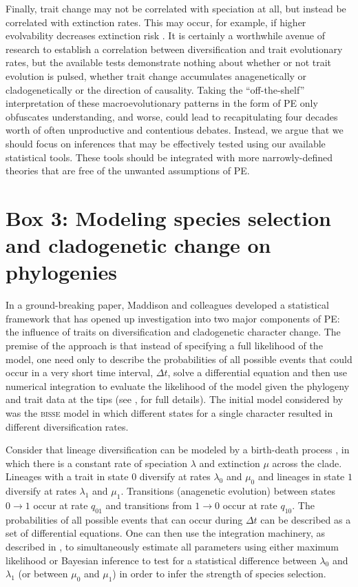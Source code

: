Finally, trait change may not be correlated with speciation at all, but instead be correlated with extinction rates.  This may occur, for example, if higher evolvability decreases extinction risk \citep{Lanfear2010}. It is certainly a worthwhile avenue of research to establish a correlation between diversification and trait evolutionary rates, but the available tests demonstrate nothing about whether or not trait evolution is pulsed, whether trait change accumulates anagenetically or cladogenetically or the direction of causality. Taking the ``off-the-shelf'' interpretation of these macroevolutionary patterns in the form of PE only obfuscates understanding, and worse, could lead to recapitulating four decades worth of often unproductive and contentious debates. Instead, we argue that we should focus on inferences that may be effectively tested using our available statistical tools. These tools should be integrated with more narrowly-defined theories that are free of the unwanted assumptions of PE.  

\section{Box 3: Modeling species selection and cladogenetic change on phylogenies}

In a ground-breaking paper, Maddison and colleagues \citeyearpar{Maddison2007} developed a statistical framework that has opened up investigation into two major components of PE: the influence of traits on diversification \citep[``species selection'', \textit{sensu}][]{CoyneOrr, RaboskyMcCune2010} and cladogenetic character change. The premise of the approach is that instead of specifying a full likelihood of the model, one need only to describe the probabilities of all possible events that could occur in a very short time interval, $\Delta t$, solve a differential equation and then use numerical integration to evaluate the likelihood of the model given the phylogeny and trait data at the tips (see \citealt{Maddison2007}, for full details). The initial model considered by \citet{Maddison2007} was the \textsc{bisse} model in which different states for a single character resulted in different diversification rates.

Consider that lineage diversification can be modeled by a birth-death process \citep{Kendall1948}, in which there is a constant rate of speciation $\lambda$ and extinction $\mu$ across the clade. Lineages with a trait in state $0$ diversify at rates $\lambda_0$ and $\mu_0$ and lineages in state $1$ diversify at rates $\lambda_1$ and $\mu_1$. Transitions (anagenetic evolution) between states $0 \rightarrow 1$ occur at rate $q_{01}$ and transitions from $1 \rightarrow 0$ occur at rate $q_{10}$. The probabilities of all possible events that can occur during $\Delta t$ can be described as a set of differential equations. One can then use the integration machinery, as described in \citet{Maddison2007}, to simultaneously estimate all parameters using either maximum likelihood or Bayesian inference to test for a statistical difference between $\lambda_{0}$ and $\lambda_{1}$ (or between $\mu_0$ and $\mu_1$) in order to infer the strength of species selection.

